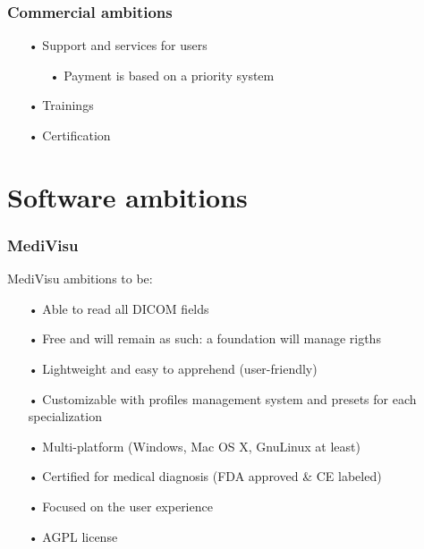 \documentclass[11pt]{beamer}
\begin{document}
\begin{frame}
\frametitle{Commercial ambitions}
\begin{itemize}[<+->]
\item[•] Support and services for users
\begin{itemize}[<+->]
\item[•] Payment is based on a priority system
\end{itemize}
\item[•] Trainings
\item[•] Certification
\end{itemize}
\end{frame}

\section{Software ambitions}

\begin{frame}
\frametitle{MediVisu}
MediVisu ambitions to be:
\begin{itemize}[<+->]
\item[•] Able to read all DICOM fields
\item[•] Free and will remain as such: a foundation will manage rigths
\item[•] Lightweight and easy to apprehend (user-friendly)
\item[•] Customizable with profiles management system and presets for each specialization
\item[•] Multi-platform (Windows, Mac OS X, GnuLinux at least)
\item[•] Certified for medical diagnosis (FDA approved \& CE labeled)
\item[•] Focused on the user experience
\item[•] AGPL license
\end{itemize}
\end{frame}

%
\end{document}
